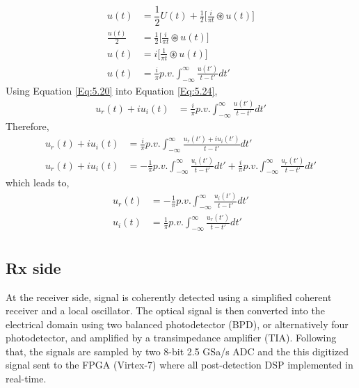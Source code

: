 \begin{equation}
\begin{split}
{u}(t)&=\dfrac{1}{2}{U}(t)+\frac{1}{2}\bigg[\frac{i}{\pi t} \circledast {u}(t) \bigg]\\
\frac{{u}(t)}{2} &=\frac{1}{2}\bigg[\frac{i}{\pi t} \circledast {u}(t) \bigg]\\
{u}(t) &=i\bigg[\frac{1}{\pi t} \circledast {u}(t) \bigg]\\
{u}(t) &=\frac{i}{\pi} p.v. \int_{-\infty}^{\infty} \frac{u(t')}{t-t'} dt' 
\end{split}
\label{Eq:5.24}
\end{equation}
Using Equation \ref{Eq:5.20} into Equation \ref{Eq:5.24},
\begin{equation}
\begin{split}
u_r(t)+iu_i(t) &=\frac{i}{\pi} p.v. \int_{-\infty}^{\infty} \frac{u(t')}{t-t'} dt' 
\end{split}
\label{Eq:5.24}
\end{equation}
Therefore,
\begin{equation}
\begin{split}
u_r(t)+iu_i(t) &=\frac{i}{\pi} p.v. \int_{-\infty}^{\infty} \frac{u_r(t')+iu_i(t')}{t-t'} dt' \\
u_r(t)+iu_i(t)&=-\frac{1}{\pi} p.v. \int_{-\infty}^{\infty} \frac{u_i(t')}{t-t'} dt' + \frac{i}{\pi} p.v. \int_{-\infty}^{\infty} \frac{u_r(t')}{t-t'} dt'
\end{split}
\label{Eq:5.24}
\end{equation}
which leads to,
\begin{equation}
\begin{split}
u_r(t) &=-\frac{1}{\pi} p.v. \int_{-\infty}^{\infty} \frac{u_i(t')}{t-t'} dt' \\
u_i(t) &=\frac{1}{\pi} p.v. \int_{-\infty}^{\infty} \frac{u_r(t')}{t-t'} dt' \\
\end{split}
\label{Eq:5.24}
\end{equation}





  



\subsection{Rx side}
At the receiver side, signal is coherently detected using a simplified coherent receiver and a local oscillator. The optical signal is then converted into the electrical domain using two balanced photodetector (BPD), or alternatively four photodetector, and amplified by a transimpedance amplifier (TIA). Following that, the signals are sampled by two 8-bit 2.5 GSa/s ADC and the this digitized signal sent to the FPGA (Virtex-7) where all post-detection DSP implemented in real-time.

